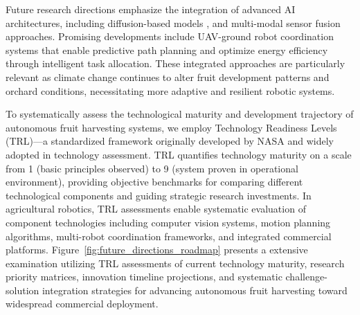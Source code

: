 \documentclass{ieeeaccess}
\begin{document}
Future research directions emphasize the integration of advanced AI architectures, including diffusion-based models \cite{heschl2024synthset}, and multi-modal sensor fusion approaches. Promising developments include UAV-ground robot coordination systems that enable predictive path planning and optimize energy efficiency through intelligent task allocation. These integrated approaches are particularly relevant as climate change continues to alter fruit development patterns and orchard conditions, necessitating more adaptive and resilient robotic systems.

To systematically assess the technological maturity and development trajectory of autonomous fruit harvesting systems, we employ Technology Readiness Levels (TRL)—a standardized framework originally developed by NASA and widely adopted in technology assessment. TRL quantifies technology maturity on a scale from 1 (basic principles observed) to 9 (system proven in operational environment), providing objective benchmarks for comparing different technological components and guiding strategic research investments. In agricultural robotics, TRL assessments enable systematic evaluation of component technologies including computer vision systems, motion planning algorithms, multi-robot coordination frameworks, and integrated commercial platforms. Figure~\ref{fig:future_directions_roadmap} presents a extensive examination utilizing TRL assessments of current technology maturity, research priority matrices, innovation timeline projections, and systematic challenge-solution integration strategies for advancing autonomous fruit harvesting toward widespread commercial deployment.
\end{document}
